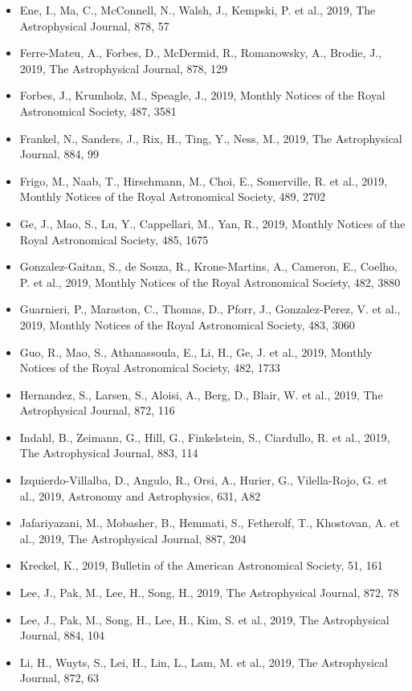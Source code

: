 \documentclass{letter}
\begin{document}
\begin{enumerate}
\begin{itemize}
\item Ene, I., Ma, C., McConnell, N., Walsh, J., Kempski, P. et al., 2019, The Astrophysical Journal, 878, 57
\item Ferre-Mateu, A., Forbes, D., McDermid, R., Romanowsky, A., Brodie, J., 2019, The Astrophysical Journal, 878, 129
\item Forbes, J., Krumholz, M., Speagle, J., 2019, Monthly Notices of the Royal Astronomical Society, 487, 3581
\item Frankel, N., Sanders, J., Rix, H., Ting, Y., Ness, M., 2019, The Astrophysical Journal, 884, 99
\item Frigo, M., Naab, T., Hirschmann, M., Choi, E., Somerville, R. et al., 2019, Monthly Notices of the Royal Astronomical Society, 489, 2702
\item Ge, J., Mao, S., Lu, Y., Cappellari, M., Yan, R., 2019, Monthly Notices of the Royal Astronomical Society, 485, 1675
\item Gonzalez-Gaitan, S., de Souza, R., Krone-Martins, A., Cameron, E., Coelho, P. et al., 2019, Monthly Notices of the Royal Astronomical Society, 482, 3880
\item Guarnieri, P., Maraston, C., Thomas, D., Pforr, J., Gonzalez-Perez, V. et al., 2019, Monthly Notices of the Royal Astronomical Society, 483, 3060
\item Guo, R., Mao, S., Athanassoula, E., Li, H., Ge, J. et al., 2019, Monthly Notices of the Royal Astronomical Society, 482, 1733
\item Hernandez, S., Larsen, S., Aloisi, A., Berg, D., Blair, W. et al., 2019, The Astrophysical Journal, 872, 116
\item Indahl, B., Zeimann, G., Hill, G., Finkelstein, S., Ciardullo, R. et al., 2019, The Astrophysical Journal, 883, 114
\item Izquierdo-Villalba, D., Angulo, R., Orsi, A., Hurier, G., Vilella-Rojo, G. et al., 2019, Astronomy and Astrophysics, 631, A82
\item Jafariyazani, M., Mobasher, B., Hemmati, S., Fetherolf, T., Khostovan, A. et al., 2019, The Astrophysical Journal, 887, 204
\item Kreckel, K., 2019, Bulletin of the American Astronomical Society, 51, 161
\item Lee, J., Pak, M., Lee, H., Song, H., 2019, The Astrophysical Journal, 872, 78
\item Lee, J., Pak, M., Song, H., Lee, H., Kim, S. et al., 2019, The Astrophysical Journal, 884, 104
\item Li, H., Wuyts, S., Lei, H., Lin, L., Lam, M. et al., 2019, The Astrophysical Journal, 872, 63

\end{itemize}
\end{enumerate}
\end{document}
